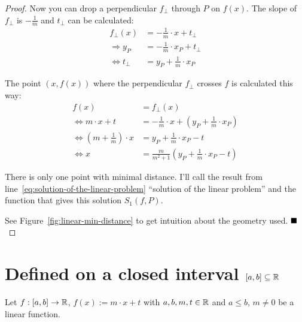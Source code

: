 \begin{proof}
    Now you can drop a perpendicular $f_\bot$ through $P$ on $f(x)$. The 
    slope of $f_\bot$ is $- \frac{1}{m}$ and $t_\bot$ can be calculated:\nobreak
    \begin{align}
                     f_\bot(x) &= - \frac{1}{m} \cdot x + t_\bot\\
        \Rightarrow        y_P &= - \frac{1}{m} \cdot x_P + t_\bot\\
        \Leftrightarrow t_\bot &= y_P + \frac{1}{m} \cdot x_P
    \end{align}

    The point $(x, f(x))$ where the perpendicular $f_\bot$ crosses $f$
    is calculated this way:
    \begin{align}
        f(x) &= f_\bot(x)\\
        \Leftrightarrow m \cdot x + t &= - \frac{1}{m} \cdot x + \left(y_P + \frac{1}{m} \cdot x_P \right)\\
        \Leftrightarrow \left (m + \frac{1}{m} \right ) \cdot x &= y_P + \frac{1}{m} \cdot x_P - t\\
        \Leftrightarrow x &= \frac{m}{m^2+1} \left ( y_P + \frac{1}{m} \cdot x_P - t \right )\label{eq:solution-of-the-linear-problem}
    \end{align}

    There is only one point with minimal distance. I'll call the result
    from line~\ref{eq:solution-of-the-linear-problem} \enquote{solution of 
    the linear problem} and the function that gives this solution 
    $S_1(f,P)$.

    See Figure~\ref{fig:linear-min-distance}
    to get intuition about the geometry used. $\qed$
\end{proof}
\clearpage

\section{Defined on a closed interval $[a,b] \subseteq \mathbb{R}$}
Let $f:[a,b] \rightarrow \mathbb{R}$, $f(x) := m\cdot x + t$ with $a,b,m,t \in \mathbb{R}$ and 
$a \leq b$, $m \neq 0$  be a linear function.

